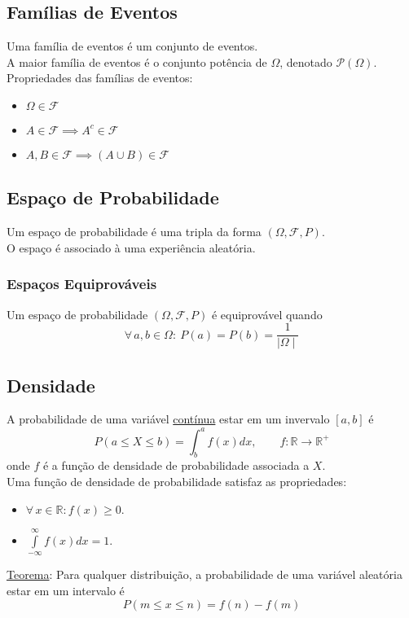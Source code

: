 \documentclass{article}
\begin{document}
\subsection{Famílias de Eventos}
Uma família de eventos é um conjunto de eventos. \\
A maior família de eventos é o conjunto potência de $\Omega$, denotado $\mathcal{P}(\Omega)$. \\[5pt]
Propriedades das famílias de eventos:
\begin{itemize}
  \item $\Omega \in \mathcal{F}$
  \item $A \in \mathcal{F} \implies A^c \in \mathcal{F}$
  \item $A, B \in \mathcal{F} \implies (A \cup B) \in \mathcal{F}$
\end{itemize}


\subsection{Espaço de Probabilidade}
Um espaço de probabilidade é uma tripla da forma $(\Omega, \mathcal{F}, P)$. \\
O espaço é associado à uma experiência aleatória.

\subsubsection{Espaços Equiprováveis}
Um espaço de probabilidade $(\Omega, \mathcal{F}, P)$ é equiprovável quando
\[ \forall \, a, b \in \Omega: \> P({a}) = P({b}) = \frac{1}{\mid \Omega \mid} \]



\subsection{Densidade}
A probabilidade de uma variável \uline{contínua} estar em um invervalo $[a,b]$ é
\[ P(a \leq X \leq b) = \int_b^a f(x) dx, \qquad f: \mathbb{R} \to \mathbb{R}^+ \]
onde $f$ é a função de densidade de probabilidade associada a $X$. \\[10pt]
Uma função de densidade de probabilidade satisfaz as propriedades:
\begin{itemize}
  \item $\forall\, x \in \mathbb{R}: f(x) \geq 0$.
  \item $\int\limits_{-\infty}^{\infty} f(x) dx = 1$.
\end{itemize}
\uline{Teorema}: Para qualquer distribuição, a probabilidade de uma variável aleatória estar em um intervalo é
\[ P(m \leq x \leq n) = f(n) - f(m) \]
\end{document}

